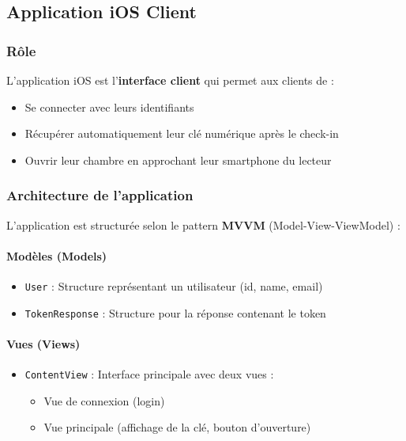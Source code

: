 \documentclass[11pt,a4paper]{article}
\begin{document}
\subsection{Application iOS Client}

\subsubsection{Rôle}

L'application iOS est l'\textbf{interface client} qui permet aux clients de :
\begin{itemize}
    \item Se connecter avec leurs identifiants
    \item Récupérer automatiquement leur clé numérique après le check-in
    \item Ouvrir leur chambre en approchant leur smartphone du lecteur
\end{itemize}

\subsubsection{Architecture de l'application}

L'application est structurée selon le pattern \textbf{MVVM} (Model-View-ViewModel) :

\paragraph{Modèles (Models)}
\begin{itemize}
    \item \texttt{User} : Structure représentant un utilisateur (id, name, email)
    \item \texttt{TokenResponse} : Structure pour la réponse contenant le token
\end{itemize}

\paragraph{Vues (Views)}
\begin{itemize}
    \item \texttt{ContentView} : Interface principale avec deux vues :
    \begin{itemize}
        \item Vue de connexion (login)
        \item Vue principale (affichage de la clé, bouton d'ouverture)
    \end{itemize}
\end{itemize}
\end{document}
